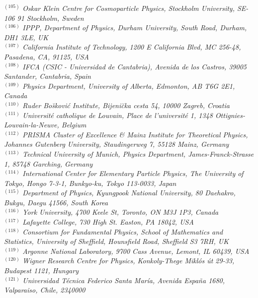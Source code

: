 {\begin{center}
$^{(105)}$ \emph{Oskar Klein Centre for Cosmoparticle Physics, Stockholm University, SE-106 91 Stockholm, Sweden}\\
$^{(106)}$ \emph{IPPP, Department of Physics, Durham University, South Road, Durham, DH1 3LE, UK}\\
$^{(107)}$ \emph{California Institute of Technology, 1200 E California Blvd, MC 256-48, Pasadena, CA, 91125, USA}\\
$^{(108)}$ \emph{IFCA (CSIC - Universidad de Cantabria), Avenida de los Castros, 39005 Santander, Cantabria, Spain}\\
$^{(109)}$ \emph{Physics Department, University of Alberta, Edmonton,  AB T6G 2E1, Canada}\\
$^{(110)}$ \emph{Ruder Bo\u skovi\'c Institute, Bijeni\u cka cesta 54, 10000 Zagreb, Croatia}\\
$^{(111)}$ \emph{Universit\'e catholique de Louvain, Place de l'universit\'e 1, 1348 Ottignies-Louvain-la-Neuve, Belgium}\\
$^{(112)}$ \emph{PRISMA Cluster of Excellence \& Mainz Institute for Theoretical Physics, Johannes Gutenberg University, Staudingerweg 7,  55128 Mainz, Germany}\\
$^{(113)}$ \emph{Technical University of Munich, Physics Department, James-Franck-Strasse 1, 85748 Garching, Germany}\\
$^{(114)}$ \emph{International Center for Elementary Particle Physics, The University of Tokyo, Hongo 7-3-1, Bunkyo-ku, Tokyo 113-0033, Japan}\\
$^{(115)}$ \emph{Department of Physics, Kyungpook National University,  80 Daehakro, Bukgu, Daegu 41566, South Korea}\\
$^{(116)}$ \emph{York University, 4700 Keele St, Toronto, ON M3J 1P3, Canada }\\
$^{(117)}$ \emph{Lafayette College, 730 High St. Easton, PA 18042, USA}\\
$^{(118)}$ \emph{Consortium for Fundamental Physics, School of Mathematics and Statistics, University of Sheffield, Hounsfield Road, Sheffield S3 7RH, UK}\\
$^{(119)}$ \emph{Argonne National Laboratory, 9700 Cass Avenue, Lemont, IL 60439, USA}\\
$^{(120)}$ \emph{Wigner Research Centre for Physics, Konkoly-Thege Mikl\'os \'ut 29-33, Budapest 1121, Hungary}\\
$^{(121)}$ \emph{Universidad T\'ecnica Federico Santa Mar\'ia, Avenida Espa\~na 1680, Valparaiso, Chile, 2340000}\\

\end{center}}
